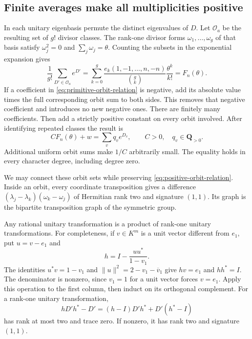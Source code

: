 \documentclass[11pt]{article}
\theoremstyle{definition}
\theoremstyle{remark}
\begin{document}
\subsection{Finite averages make all multiplicities positive}

In each unitary eigenbasis permute the distinct eigenvalues of $D$.
Let $\mathcal O_a$ be the resulting set of $g!$ divisor classes.
The rank-one divisor forms $\omega_1,\ldots,\omega_g$ of that basis
satisfy $\omega_j^2=0$ and $\sum_j\omega_j=\theta$.
Counting the subsets in the exponential expansion gives
\begin{equation}
 \frac1{g!}\sum_{D'\in\mathcal O_a}e^{D'}
 =\sum_{k=0}^g\frac{e_k(1,-1,\ldots,n,-n)}{\binom gk}
                              \frac{\theta^k}{k!}
 =F_n(\theta).
 \label{eq:finite-positive-average}
\end{equation}
If a coefficient in \eqref{eq:primitive-orbit-relation} is negative,
add its absolute value times the full corresponding orbit sum to
both sides.  This removes that negative coefficient and introduces
no new negative ones.  There are finitely many coefficients.
Then add a strictly positive constant on every orbit involved.
After identifying repeated classes the result is
\begin{equation}
 C F_n(\theta)+w=\sum_v q_v e^{D_v},
 \qquad C>0,\quad q_v\in\mathbf Q_{>0}.
 \label{eq:positive-orbit-relation}
\end{equation}
Additional uniform orbit sums make $1/C$ arbitrarily small.
The equality holds in every character degree, including degree zero.

We may connect these orbit sets while preserving
\eqref{eq:positive-orbit-relation}.  Inside an orbit, every coordinate
transposition gives a difference
$(\lambda_j-\lambda_k)(\omega_k-\omega_j)$ of Hermitian rank two
and signature $(1,1)$.  Its graph is the bipartite transposition
graph of the symmetric group.

Any rational unitary transformation is a product of rank-one unitary
transformations.  For completeness, if $v\in K^m$ is a unit vector
different from $e_1$, put $u=v-e_1$ and
\[
 h=I-\frac{uu^*}{1-v_1}.
\]
The identities $u^*v=1-v_1$ and
$\|u\|^2=2-v_1-\overline v_1$ give $hv=e_1$ and $hh^*=I$.
The denominator is nonzero, since $v_1=1$ for a unit vector forces
$v=e_1$.  Apply this operation to the first column, then induct on
its orthogonal complement.  For a rank-one unitary transformation,
\[
 hD'h^*-D'=(h-I)D'h^*+D'(h^*-I)
\]
has rank at most two and trace zero.  If nonzero, it has rank two
and signature $(1,1)$.
\end{document}
